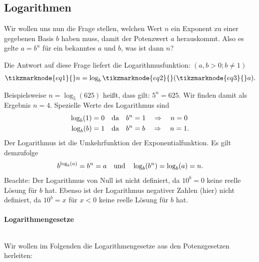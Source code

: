 \subsection{Logarithmen}

Wir wollen uns nun die Frage stellen, welchen Wert $n$ ein Exponent zu einer gegebenen Basis $b$ haben muss, damit der Potenzwert $a$ herauskommt. Also es gelte $a = b^n$ für ein bekanntes $a$ und $b$, was ist dann $n$?

Die Antwort auf diese Frage liefert die Logarithmusfunktion: $(a,b > 0; b \neq 1)$
\begin{align}
    \tikzmarknode{eq1}{}n = \log_b\tikzmarknode{eq2}{}(\tikzmarknode{eq3}{}a).
\end{align}

Beispielsweise $n = \log_5(625)$ heißt, dass gilt: $5^n = 625$. Wir finden damit als Ergebnis $n=4$. Spezielle Werte des Logarithmus sind 
\begin{align}
    \begin{split}
        \log_b (1) &= 0 \qq{da} b^n = 1 \quad \Rightarrow \quad n=0\\
        \log_b (b) &= 1 \qq{da} b^n = b \quad \Rightarrow \quad n=1.
    \end{split}
\end{align}
Der Logarithmus ist die Umkehrfunktion der Exponentialfunktion. Es gilt demzufolge 
\begin{align}
    b^{\log_b(a)} = b^n = a \qq{und} \log_b(b^n) = \log_b(a) = n.
\end{align}
Beachte: Der Logarithmus von Null ist nicht definiert, da $10^b = 0$ keine reelle Lösung für $b$ hat. Ebenso ist der Logarithmus negativer Zahlen (hier) nicht definiert, da $10^b = x$ für $x <0$ keine reelle Lösung für $b$ hat.

\paragraph{Logarithmengesetze}$~$

Wir wollen im Folgenden die Logarithmengesetze aus den Potenzgesetzen herleiten: 

